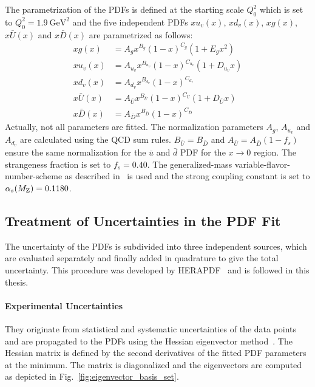 The parametrization of the PDFs is defined at the starting scale
$Q_0^2$ which is set to $Q_0^2 = \SI{1.9}{\GeV \squared}$ and the five
independent PDFs $xu_v(x)$, $xd_v(x)$, $xg(x)$, $x\bar{U}(x)$ and $x\bar{D}(x)$
are parametrized as follows:
%
\begin{align*}
  xg(x) &= A_g x^{B_g} (1-x)^{C_g} (1 + E_g x^2)\\
  xu_v(x) &= A_{u_{v}} x^{B_{u_{v}}} (1-x)^{C_{u_{v}}}(1 + D_{u_{v}}x)\\
  xd_v(x) &= A_{d_v} x^{B_{d_v}} (1-x)^{C_{d_{v}}}\\
  x\bar U(x) &= A_{\bar U} x^{B_{\bar U}} (1-x)^{C_{\bar U}}(1 + D_{\bar U}x)\\
  x\bar D(x) &= A_{\bar D} x^{B_{\bar D}} (1-x)^{C_{\bar D}}
\end{align*}
%
Actually, not all parameters are fitted. The normalization parameters $A_g$,
$A_{u_{v}}$ and $A_{d_{v}}$ are calculated using the QCD sum rules. $B_{\bar
U}=B_{\bar D}$ and $A_{\bar U} = A_{\bar D}(1-f_s)$ ensure the same
normalization for the $\bar u$ and $\bar d$ PDF for the $x \rightarrow 0$
region. The strangeness fraction is set to $f_s = 0.40$. The generalized-mass
variable-flavor-number-scheme as described in~\cite{Thorne:1997ga,Thorne:2006qt}
is used and the strong coupling constant is set to $\alpha_{s}(M_\mathrm{Z})= 0.1180$.


\subsection{Treatment of Uncertainties in the PDF Fit}
\label{section:treatment_pdf_uncertainties}

The uncertainty of the PDFs is subdivided into three independent sources, which
are evaluated separately and finally added in quadrature to give the total
uncertainty. This procedure was developed by HERAPDF~\cite{Abramowicz:2015mha}
and is followed in this thesis.

\paragraph{Experimental Uncertainties} 
They originate from statistical and systematic uncertainties of the data
points and are propagated to the PDFs using the Hessian eigenvector
method~\cite{Pumplin:2001ct}. The Hessian matrix is defined by the second
derivatives of the fitted PDF parameters at the \chisq minimum. The matrix is
diagonalized and the eigenvectors are computed as depicted in
Fig.~\ref{fig:eigenvector_basis_set}. 


